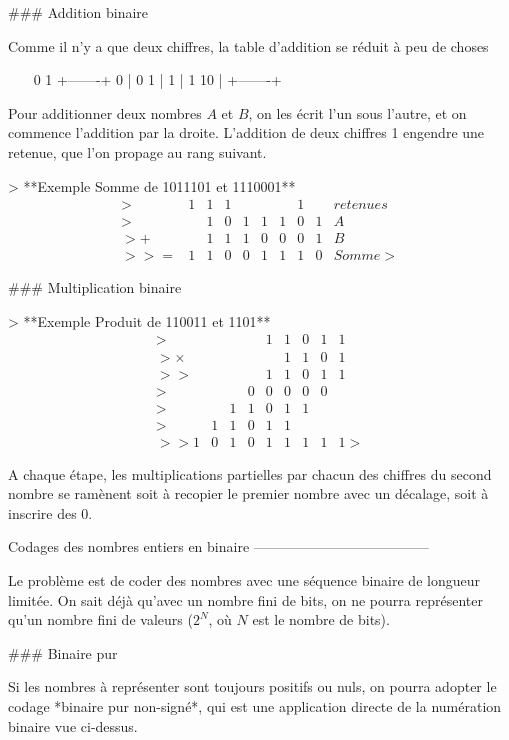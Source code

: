 ### Addition binaire

Comme il n'y a que deux chiffres, la table d'addition se réduit à peu de
choses

~~~
       0   1
	 +-------+
   0 | 0   1 |
   1 | 1  10 |
	 +-------+
~~~

Pour additionner deux nombres $A$ et $B$, on les écrit l'un sous
l'autre, et on commence l'addition par la droite. L'addition de deux
chiffres 1 engendre une retenue, que l'on propage au rang suivant.

> **Exemple Somme de 1011101 et 1110001** $$\begin{array}{rrrrrrrrrl}
> &1 & 1 & 1 &   &   &   & 1 &   & retenues \\
> &  & 1 & 0 & 1 & 1 & 1 & 0 & 1 & A \\
> +&  & 1 & 1 & 1 & 0 & 0 & 0 & 1 & B \\
> \hline
> = &1 & 1 & 0 & 0 & 1 & 1 & 1 & 0 & Somme
> \end{array}$$

### Multiplication binaire

> **Exemple Produit de 110011 et 1101** $$\begin{array}{rrrrrrrrrr}
>  & & & &1&1&0&1&1 \\
> \times & & & & &1&1&0&1 \\
> \hline
>  & & & &1&1&0&1&1 \\
>  & & &0&0&0&0&0& \\
>  & &1&1&0&1&1& & \\
>  &1&1&0&1&1& \\
> \hline
> 1&0&1&0&1&1&1&1&1
> \end{array}$$

A chaque étape, les multiplications partielles par chacun des chiffres
du second nombre se ramènent soit à recopier le premier nombre avec un
décalage, soit à inscrire des 0.

Codages des nombres entiers en binaire
--------------------------------------

Le problème est de coder des nombres avec une séquence binaire de
longueur limitée. On sait déjà qu'avec un nombre fini de bits, on ne
pourra représenter qu'un nombre fini de valeurs ($2^N$, où $N$ est le
nombre de bits).

### Binaire pur

Si les nombres à représenter sont toujours positifs ou nuls, on pourra
adopter le codage *binaire pur non-signé*, qui est une application
directe de la numération binaire vue ci-dessus.

